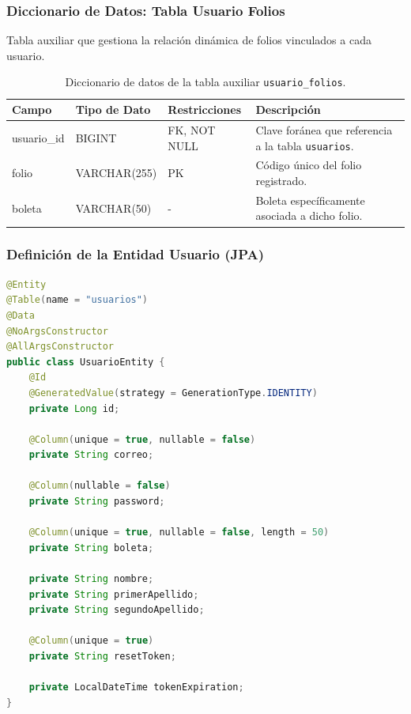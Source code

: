 \subsubsection{Diccionario de Datos: Tabla Usuario Folios}
Tabla auxiliar que gestiona la relaci\'on din\'amica de folios vinculados a cada usuario.

\begin{table}[H]
\centering
\small
\begin{tabularx}{\textwidth}{|l|l|l|X|}
\hline
\rowcolor{azulESCOM} 
\color{white}\textbf{Campo} & \color{white}\textbf{Tipo de Dato} & \color{white}\textbf{Restricciones} & \color{white}\textbf{Descripci\'on} \\ \hline
usuario\_id & BIGINT & FK, NOT NULL & Clave for\'anea que referencia a la tabla \texttt{usuarios}. \\ \hline
folio & VARCHAR(255) & PK & C\'odigo \'unico del folio registrado. \\ \hline
boleta & VARCHAR(50) & - & Boleta espec\'ificamente asociada a dicho folio. \\ \hline
\end{tabularx}
\caption{Diccionario de datos de la tabla auxiliar \texttt{usuario\_folios}.}
\label{tab:dict_usuario_folios}
\end{table}

\subsubsection{Definici\'on de la Entidad Usuario (JPA)}
\begin{lstlisting}[language=Java, caption={Entidad Java para la gesti\'on de usuarios.}, label={lst:java_usuario}]
@Entity
@Table(name = "usuarios")
@Data
@NoArgsConstructor
@AllArgsConstructor
public class UsuarioEntity {
    @Id
    @GeneratedValue(strategy = GenerationType.IDENTITY)
    private Long id;

    @Column(unique = true, nullable = false)
    private String correo;
    
    @Column(nullable = false)
    private String password;
    
    @Column(unique = true, nullable = false, length = 50)
    private String boleta;
    
    private String nombre;
    private String primerApellido;
    private String segundoApellido;
    
    @Column(unique = true)
    private String resetToken;
    
    private LocalDateTime tokenExpiration;
}
\end{lstlisting}

